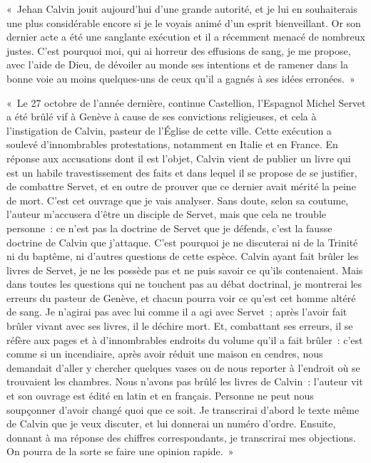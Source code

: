 \documentclass[french,twoside]{book} %
\newenvironment{quoteblock}%
  {\begin{quoting}}
  {\end{quoting}}
\newenvironment{quotebar}{%
    \def\FrameCommand{{\color{rubric!10!}\vrule width 0.5em} \hspace{0.9em}}%
    \def\OuterFrameSep{2pt} %
    \MakeFramed {\advance\hsize-\width \FrameRestore}
  }%
  {%
    \endMakeFramed
  }
\renewenvironment{quoteblock}%
  {%
    \savenotes
    \setstretch{0.9}
    \normalfont
    \begin{quotebar}
  }
  {%
    \end{quotebar}
    \spewnotes
  }
\begin{document}
\begin{quoteblock}
 \noindent « Jehan Calvin jouit aujourd’hui d’une grande autorité, et je lui en souhaiterais une plus considérable encore si je le voyais animé d’un esprit bienveillant. Or son dernier acte a été une sanglante exécution et il a récemment menacé de nombreux justes. C’est pourquoi moi, qui ai horreur des effusions de sang, je me propose, avec l’aide de Dieu, de dévoiler au monde ses intentions et de ramener dans la bonne voie au moins quelques-uns de ceux qu’il a gagnés à ses idées erronées. »\par
 « Le 27 octobre de l’année dernière, continue Castellion, l’Espagnol Michel Servet a été brûlé vif à Genève à cause de ses convictions religieuses, et cela à l’instigation de Calvin, pasteur de l’Église de cette ville. Cette exécution a soulevé d’innombrables protestations, notamment en Italie et en France. En réponse aux accusations dont il est l’objet, Calvin vient de publier un livre qui est un habile travestissement des faits et dans lequel il se propose de se justifier, de combattre Servet, et en outre de prouver que ce dernier avait mérité la peine de mort. C’est cet ouvrage que je vais analyser. Sans doute, selon sa coutume, l’auteur m’accusera d’être un disciple de Servet, mais que cela ne trouble personne : ce n’est pas la doctrine de Servet que je défends, c’est la fausse doctrine de Calvin que j’attaque. C’est pourquoi je ne discuterai ni de la Trinité ni du baptême, ni d’autres questions de cette espèce. Calvin ayant fait brûler les livres de Servet, je ne les possède pas et ne puis savoir ce qu’ils contenaient. Mais dans toutes les questions qui ne touchent pas au débat doctrinal, je montrerai les erreurs du pasteur de Genève, et chacun pourra voir ce qu’est cet homme altéré de sang. Je n’agirai pas avec lui comme il a agi avec Servet ; après l’avoir fait brûler vivant avec ses livres, il le déchire mort. Et, combattant ses erreurs, il se réfère aux pages et à d’innombrables endroits du volume qu’il a fait brûler : c’est comme si un incendiaire, après avoir réduit une maison en cendres, nous demandait d’aller y chercher quelques vases ou de nous reporter à l’endroit où se trouvaient les chambres. Nous n’avons pas brûlé les livres de Calvin : l’auteur vit et son ouvrage est édité en latin et en français. Personne ne peut nous soupçonner d’avoir changé quoi que ce soit. Je transcrirai d’abord le texte même de Calvin que je veux discuter, et lui donnerai un numéro d’ordre. Ensuite, donnant à ma réponse des chiffres correspondants, je transcrirai mes objections. On pourra de la sorte se faire une opinion rapide. »
 \end{quoteblock}
\end{document}
